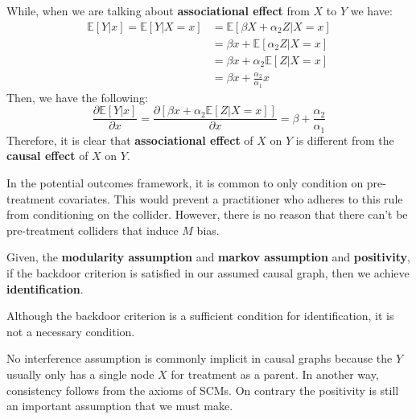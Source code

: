 While, when we are talking about \textbf{associational effect} from $X$ to $Y$ we have:
\begin{equation}
    \begin{array}{ll}
        \mathbb{E}[Y | x] = \mathbb{E}[Y | X = x] & = \mathbb{E}[\beta X + \alpha_2 Z | X = x] \\
                                                  & = \beta x + \mathbb{E}[\alpha_2 Z |X = x]  \\
                                                  & = \beta x + \alpha_2 \mathbb{E}[Z |X = x]  \\
                                                  & = \beta x + \frac{\alpha_2}{\alpha_1} x
    \end{array}
\end{equation}
Then, we have the following:
\begin{equation}
    \frac{\partial \mathbb{E}[Y |x]}{\partial x} = \frac{\partial[\beta x + \alpha_2 \mathbb{E}[Z |X = x]]}{\partial x} = \beta + \frac{\alpha_2}{\alpha_1}
\end{equation}
Therefore, it is clear that \textbf{associational effect} of  $X$ on $Y$ is
different from the \textbf{causal effect} of $X$ on $Y$.

In the potential outcomes framework, it is common to only condition on pre-treatment
covariates. This would prevent a practitioner who adheres to this rule from
conditioning on the collider. However, there is no reason that there can't be
pre-treatment colliders that induce $M$ bias.

Given, the \textbf{modularity assumption} and \textbf{markov assumption} and
\textbf{positivity}, if the backdoor criterion is satisfied in our assumed causal
graph, then we achieve \textbf{identification}.

\begin{note}
    Although the backdoor criterion is a sufficient condition for identification, 
    it is not a necessary condition.
\end{note}
\begin{note}
    No interference assumption is commonly implicit in causal graphs because the $Y$
    usually only has a single node $X$ for treatment as a parent. In another way,
    consistency follows from the axioms of SCMs. On contrary the positivity is still
    an important assumption that we must make.
\end{note}


